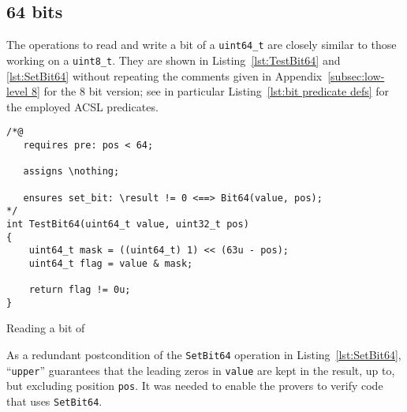 \FloatBarrier

\subsection{64 bits}
\label{subsec:low-level 64}



The operations to read and write a bit of a \lstinline{uint64_t} are closely similar to
those working on a \lstinline{uint8_t}.
%
They are shown in Listing~\ref{lst:TestBit64}
and \ref{lst:SetBit64} without repeating the comments given
in Appendix~\ref{subsec:low-level 8} for the 8 bit version; see in particular
Listing~\ref{lst:bit predicate defs} for the employed ACSL predicates.





\begin{listing}[hbt]
\begin{minipage}{0.99\textwidth}
\begin{lstlisting}[style=acsl-block]
/*@
   requires pre: pos < 64;

   assigns \nothing;

   ensures set_bit: \result != 0 <==> Bit64(value, pos);
*/
int TestBit64(uint64_t value, uint32_t pos)
{
    uint64_t mask = ((uint64_t) 1) << (63u - pos);
    uint64_t flag = value & mask;

    return flag != 0u;
}
\end{lstlisting}
\end{minipage}
\caption{\label{lst:TestBit64}Reading a bit of }
\end{listing}









As a redundant postcondition of the \lstinline{SetBit64} operation in
Listing~\ref{lst:SetBit64},
``\lstinline{upper}'' guarantees that the leading zeros in
\lstinline{value} are kept in the result, up to, but excluding position \lstinline{pos}.
%
It was needed to enable the provers to verify code that uses \lstinline{SetBit64}.





